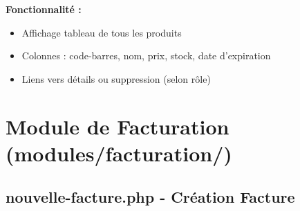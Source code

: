 \documentclass[12pt,a4paper]{report}
\begin{document}
\textbf{Fonctionnalité :}
\begin{itemize}
    \item Affichage tableau de tous les produits
    \item Colonnes : code-barres, nom, prix, stock, date d'expiration
    \item Liens vers détails ou suppression (selon rôle)
\end{itemize}

\section{Module de Facturation (modules/facturation/)}

\subsection{nouvelle-facture.php - Création Facture}
\end{document}
